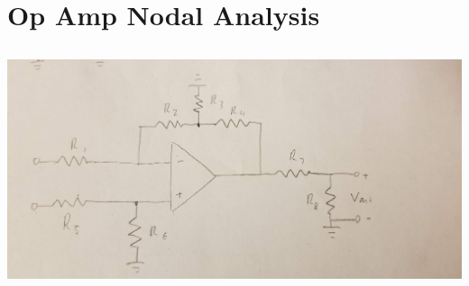 \documentclass[]{article}
\begin{document}
\section{Op Amp Nodal Analysis}

\subsection{}

\begin{center}
	\includegraphics[width=0.7\linewidth]{20191115_175737}
\end{center}

\subsection{}
\end{document}
